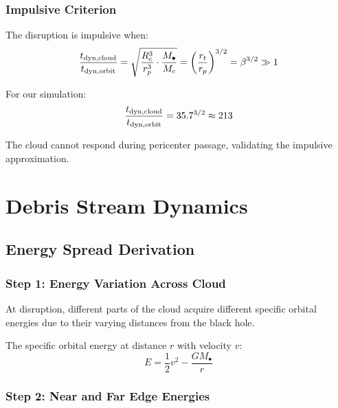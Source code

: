 \documentclass[twocolumn,amsmath,amssymb,prd,superscriptaddress,nofootinbib]{revtex4-2}
\begin{document}
\subsubsection{Impulsive Criterion}

The disruption is impulsive when:
\begin{equation}
    \frac{t_{\rm dyn,cloud}}{t_{\rm dyn,orbit}} = \sqrt{\frac{R_c^3}{r_p^3}\cdot\frac{M_\bullet}{M_c}} = \left(\frac{r_t}{r_p}\right)^{3/2} = \beta^{3/2} \gg 1
    \label{eq:impulsive}
\end{equation}

For our simulation:
\begin{equation}
    \frac{t_{\rm dyn,cloud}}{t_{\rm dyn,orbit}} = 35.7^{3/2} \approx 213
\end{equation}

The cloud cannot respond during pericenter passage, validating the impulsive approximation.

\section{Debris Stream Dynamics}
\label{sec:debris}

\subsection{Energy Spread Derivation}
\label{sec:energy_spread}

\subsubsection{Step 1: Energy Variation Across Cloud}

At disruption, different parts of the cloud acquire different specific orbital energies due to their varying distances from the black hole.

The specific orbital energy at distance $r$ with velocity $v$:
\begin{equation}
    E = \frac{1}{2}v^2 - \frac{GM_\bullet}{r}
\end{equation}

\subsubsection{Step 2: Near and Far Edge Energies}
\end{document}
